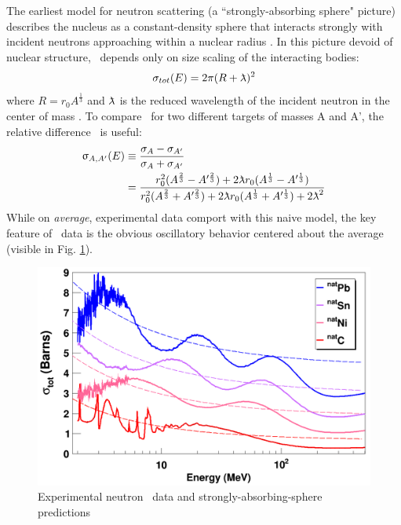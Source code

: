 \begin{eqation}
The earliest model for neutron scattering (a ``strongly-absorbing sphere"
picture) describes the nucleus as a constant-density sphere that interacts
strongly with incident neutrons approaching within a nuclear radius
\cite{Feshbach1949}. In this picture devoid of nuclear structure, \tot\ depends
only on size scaling of the interacting bodies:
\begin{equation} \label{SASAbsolute}
    \sigma_{tot}(E) = 2\pi(R + \lambdabar)^{2}
\end{equation}
where $R=r_{0}A^{\frac{1}{3}}$ and $\lambdabar$ is the reduced wavelength
of the incident neutron in the center of mass \cite{Fernbach1949, Satchler1980}. 
To compare \tot\ for two different targets of masses A and A', the relative
difference \totRD\ is useful:
\begin{equation} \label{SASRelDiff}
    \begin{split}
        \totRD & \equiv
    \frac{\sigma_{A}-\sigma_{A'}}{\sigma_{A}+\sigma_{A'}} \\
    & =
    \frac{r_{0}^{2}(A^{\frac{2}{3}}-A'^{\frac{2}{3}}) +
    2\lambdabar r_{0}(A^{\frac{1}{3}}-A'^{\frac{1}{3}})}
    {r_{0}^{2}(A^{\frac{2}{3}}+A'^{\frac{2}{3}}) +
    2\lambdabar r_{0}(A^{\frac{1}{3}}+A'^{\frac{1}{3}}) + 2\lambdabar^{2}}
    \end{split}
\end{equation}
While on \textit{average}, experimental data comport with this naive
model, the key feature of \tot\ data is the obvious oscillatory
behavior centered about the average (visible in Fig.
\ref{SASphereVsExperiment}).

\begin{figure}
    \includegraphics[scale=0.3]{figures/SASphereVsExperiment.png}
    \caption{Experimental neutron \tot\ data and strongly-absorbing-sphere predictions}
    \label{SASphereVsExperiment}
\end{figure}


\end{eqation}

